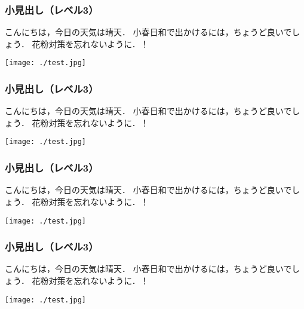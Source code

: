\documentclass{ltjsbook}
\begin{document}
\subsubsection{小見出し（レベル3）}%
\begin{minipage}[c]{\dimexpr\linewidth-75mm-\leftskip} %
  こんにちは，今日の天気は晴天．
  小春日和で出かけるには，ちょうど良いでしょう．
  花粉対策を忘れないように．！
  \vfill%
\end{minipage}%
\hspace{5mm}%
\begin{minipage}[c]{70mm}
  \texttt{[image: ./test.jpg]}
  \vspace{1em}
\end{minipage}%



\subsubsection{小見出し（レベル3）}%
\begin{minipage}[c]{\dimexpr\linewidth-75mm-\leftskip} %
  こんにちは，今日の天気は晴天．
  小春日和で出かけるには，ちょうど良いでしょう．
  花粉対策を忘れないように．！
  \vfill%
\end{minipage}%
\hspace{5mm}%
\begin{minipage}[b]{70mm}
  \texttt{[image: ./test.jpg]}
  \vspace{1em}
\end{minipage}%




\newpage
\subsubsection{小見出し（レベル3）}%
\begin{minipage}[c]{\dimexpr\linewidth-75mm-\leftskip} %
  \lipsum[2]
  こんにちは，今日の天気は晴天．
  小春日和で出かけるには，ちょうど良いでしょう．
  花粉対策を忘れないように．！
  \vfill%
\end{minipage}%
\hspace{5mm}%
\begin{minipage}[t]{70mm} %
  \texttt{[image: ./test.jpg]}%
  \vspace{1em}%
\end{minipage}%


\subsubsection{小見出し（レベル3）}%
\begin{minipage}[c]{\dimexpr\linewidth-75mm-\leftskip} %
  \lipsum[2]
  こんにちは，今日の天気は晴天．
  小春日和で出かけるには，ちょうど良いでしょう．
  花粉対策を忘れないように．！
  \vfill%
\end{minipage}%
\hspace{5mm}%
\begin{minipage}[c]{70mm} %
  \texttt{[image: ./test.jpg]}%
  \vspace{1em}%
\end{minipage}%
\end{document}
